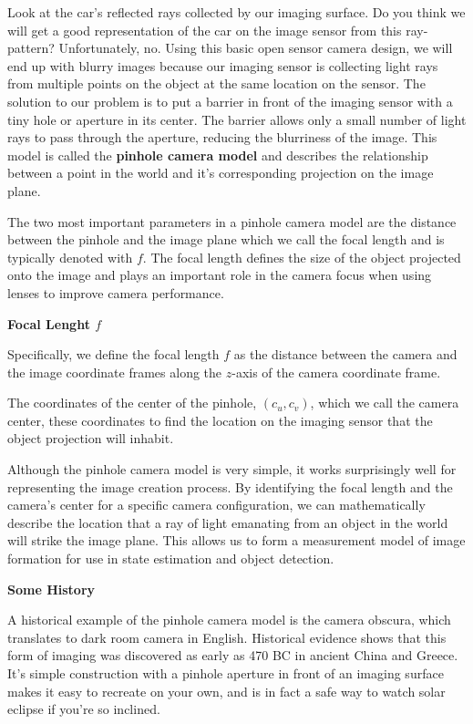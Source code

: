 Look at the car's reflected rays collected by our imaging surface. Do you think we will get
a good representation of the car on the image sensor
from this ray-pattern? Unfortunately, no. Using this basic open
sensor camera design, we will end up with blurry images because our imaging
sensor is collecting light rays from multiple points on the object at the same
location on the sensor. The solution to our problem is to put a barrier in front of the imaging sensor
with a tiny hole or aperture in its center. The barrier allows only a small number of light rays to pass
through the aperture, reducing the blurriness of the image. This model is called the \textbf{pinhole camera model} and describes the relationship between a point in
the world and it's corresponding projection on the image plane. 

The two most important parameters in a pinhole camera model are the distance between
the pinhole and the image plane which we call the focal length and is typically denoted with $f$. 
The focal length defines the size of the object projected
onto the image and plays an important role
in the camera focus when using lenses to improve camera performance. 

\begin{framed}
\begin{remark}{\textbf{Focal Lenght $f$}}

Specifically, we define the focal length $f$
as the distance between the camera and the
image coordinate frames along the $z$-axis of
the camera coordinate frame.
\end{remark}
\end{framed}


The coordinates of
the center of the pinhole, $(c_u, c_v)$, which we call the camera center, these coordinates to
find the location on the imaging sensor that the object projection will inhabit. 

Although the pinhole camera model is very simple, it works surprisingly well for representing the image
creation process. By identifying
the focal length and the camera's center for
a specific camera configuration, we can mathematically describe
the location that a ray of light emanating from an object in the world will strike
the image plane. This allows us to form a measurement model of image formation for use in state estimation
and object detection. 


\begin{framed}
\begin{remark}{\textbf{Some History}}

A historical example of the pinhole camera model
is the camera obscura, which translates to
dark room camera in English. Historical evidence shows that this form of imaging
was discovered as early as 470 BC in ancient
China and Greece. It's simple construction with a pinhole aperture in front of an imaging surface makes it
easy to recreate on your own, and is in fact a safe way to watch solar eclipse if
you're so inclined.
\end{remark}
\end{framed}


